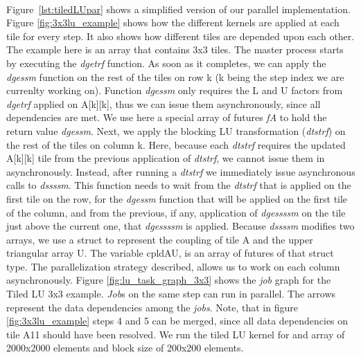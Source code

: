 \paragraph{}
	Figure~\ref{lst:tiledLUpar} shows a simplified version of our parallel implementation.  Figure \ref{fig:3x3lu_example}
shows how the different kernels are applied at each tile for every step.  It also shows how different tiles are depended
upon each other.  The example here is an array that contains 3x3 tiles.  The master process 
starts by executing the \emph{dgetrf}  function.  As soon as it completes, we can apply 
the \emph{dgessm} function on the rest of the tiles on row k (k being the step index we are currenlty working on).
Function \emph{dgessm} only requires the L and U factors from \emph{dgetrf} applied on A[k][k], thus we can issue them 
asynchronously, since all dependencies are met.
We use here a special array of futures \emph{fA} to hold the return value \emph{dgessm}.   
Next, we apply the blocking LU transformation (\emph{dtstrf}) on the rest of the tiles on column k.  Here, because
each \emph{dtstrf} requires the updated A[k][k] tile from the previous application of \emph{dtstrf}, we cannot issue
them in asynchronously.  Instead, after running a \emph{dtstrf} we immediately issue asynchronous calls to \emph{dssssm}.
This function needs to wait from the \emph{dtstrf} that is applied on the first tile on the row, for the \emph{dgessm}
function that will be applied on the first tile of the column, and from the previous, if any, application of \emph{dgessssm}
on the tile just above the current one, that \emph{dgessssm} is applied.  Because \emph{dssssm} modifies two arrays, we use
a struct to represent the coupling of tile A and the upper triangular array U.  The variable cpldAU, is an array of futures
of that struct type.  The parallelization strategy described, allows us to work on each column asynchronously.  
Figure \ref{fig:lu_task_graph_3x3} shows the \emph{job} graph for the Tiled LU 3x3 example.  \emph{Job}s on the same 
step can run in parallel.  The arrows represent the data dependencies among the \emph{jobs}.  Note, that in figure
\ref{fig:3x3lu_example} steps 4 and 5 can be merged, since all data dependencies on tile A11 should have been resolved.
We run the tiled LU kernel for and array of 2000x2000 elements and block size of 200x200 elements.


